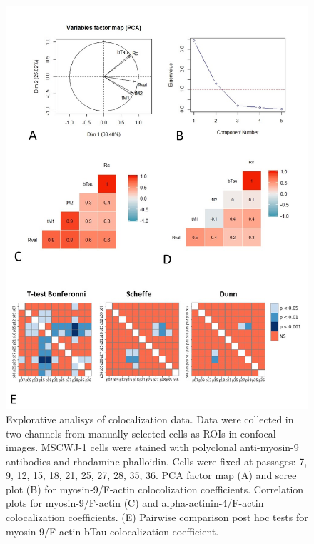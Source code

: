 \documentclass[num-refs]{wiley-article}
\begin{document}
\begin{figure}[hbt!]
  \includegraphics[width=1\linewidth]{supp2.jpg}
  \caption{Explorative analisys of colocalization data. Data were collected in two channels from manually selected cells as ROIs in confocal images. MSCWJ-1 cells were stained with polyclonal anti-myosin-9 antibodies and rhodamine phalloidin. Cells were fixed at passages: 7, 9, 12, 15, 18, 21, 25, 27, 28, 35, 36.
  PCA factor map (A) and scree plot (B) for myosin-9/F-actin colocolization coefficients. Correlation plots for myosin-9/F-actin (C) and alpha-actinin-4/F-actin colocalization coefficients. (E) Pairwise comparison post hoc tests for myosin-9/F-actin bTau colocalization coefficient.}
  \centering
\end{figure}
\end{document}
